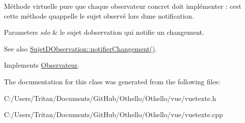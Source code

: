 Méthode virtuelle pure que chaque observateur concret doit implémenter \+: c\textquotesingle{}est cette méthode qu\textquotesingle{}appelle le sujet observé lors d\textquotesingle{}une notification. 


\begin{DoxyParams}{Parameters}
{\em sdo} & le sujet d\textquotesingle{}observation qui notifie un changement. \\
\hline
\end{DoxyParams}
\begin{DoxySeeAlso}{See also}
\hyperlink{class_sujet_d_observation_ab4a833d911377a2dd3c83ce8ce3ac540}{Sujet\+D\+Observation\+::notifier\+Changement()}. 
\end{DoxySeeAlso}


Implements \hyperlink{class_observateur_a4fcbecba73ee923d201246207b8470ce}{Observateur}.



The documentation for this class was generated from the following files\+:\begin{DoxyCompactItemize}
\item 
C\+:/\+Users/\+Tritan/\+Documents/\+Git\+Hub/\+Othello/\+Othello/vue/vuetexte.\+h\item 
C\+:/\+Users/\+Tritan/\+Documents/\+Git\+Hub/\+Othello/\+Othello/vue/vuetexte.\+cpp\end{DoxyCompactItemize}
